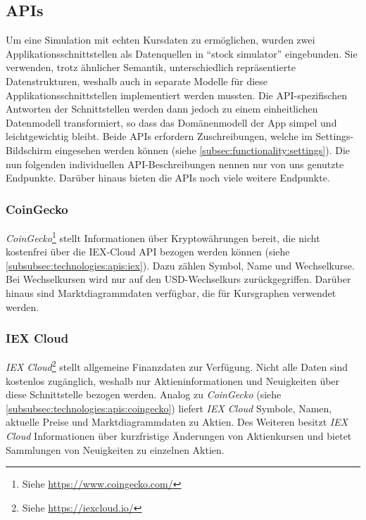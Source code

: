 \documentclass[a4paper]{article}
\begin{document}
\subsection{APIs}
\label{subsec:technologies:apis}
Um eine Simulation mit echten Kursdaten zu ermöglichen, wurden zwei Applikationsschnittstellen als Datenquellen in "`stock simulator"' eingebunden.
Sie verwenden, trotz ähnlicher Semantik, unterschiedlich repräsentierte Datenstrukturen, weshalb auch in separate Modelle für diese Applikationsschnittstellen implementiert werden mussten.
Die API-spezifischen Antworten der Schnittstellen werden dann jedoch zu einem einheitlichen Datenmodell transformiert, so dass das Domänenmodell der App simpel und leichtgewichtig bleibt.
Beide APIs erfordern Zuschreibungen, welche im Settings-Bildschirm eingesehen werden können (siehe \autoref{subsec:functionality:settings}).
Die nun folgenden individuellen API-Beschreibungen nennen nur von uns genutzte Endpunkte. Darüber hinaus bieten die APIs noch viele weitere Endpunkte.


\subsubsection{CoinGecko}
\label{subsubsec:technologies:apis:coingecko}
\textit{CoinGecko}\footnote{Siehe \url{https://www.coingecko.com/}} stellt Informationen über Kryptowährungen bereit, die nicht kostenfrei über die IEX-Cloud API bezogen werden können (siehe \autoref{subsubsec:technologies:apis:iex}).
Dazu zählen Symbol, Name und Wechselkurse.
Bei Wechselkursen wird nur auf den USD-Wechselkurs zurückgegriffen.
Darüber hinaus sind Marktdiagrammdaten verfügbar, die für Kursgraphen verwendet werden.


\subsubsection{IEX Cloud}
\label{subsubsec:technologies:apis:iex}
\textit{IEX Cloud}\footnote{Siehe \url{https://iexcloud.io/}} stellt allgemeine Finanzdaten zur Verfügung.
Nicht alle Daten sind kostenlos zugänglich, weshalb nur Aktieninformationen und Neuigkeiten über diese Schnittstelle bezogen werden.
Analog zu \textit{CoinGecko} (siehe \autoref{subsubsec:technologies:apis:coingecko}) liefert \textit{IEX Cloud} Symbole, Namen, aktuelle Preise und Marktdiagrammdaten zu Aktien.
Des Weiteren besitzt \textit{IEX Cloud} Informationen über kurzfristige Änderungen von Aktienkursen und bietet Sammlungen von Neuigkeiten zu einzelnen Aktien.
\end{document}
